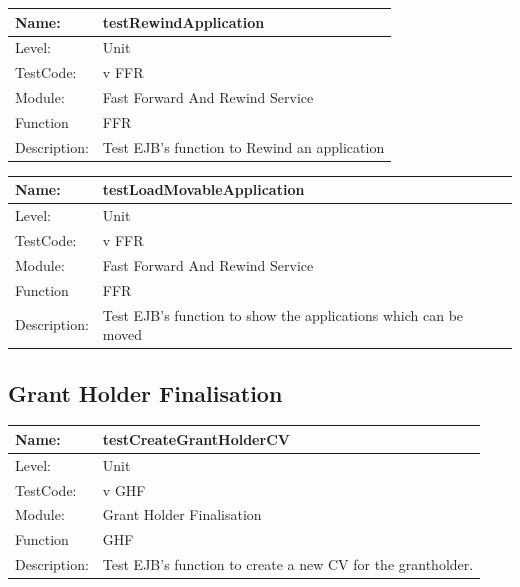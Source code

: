 \documentclass[12pt]{article}
\begin{document}
\begin{center}
\begin{tabular}{|l|p{12cm}|}
\hline

 Name: & testRewindApplication  \\
\hline
Level: & Unit \\
\hline
TestCode: & v FFR \\
\hline
Module:& Fast Forward And Rewind Service \\
\hline
Function & FFR \\
\hline
Description: & Test EJB's function to Rewind an application\\
\hline
\end{tabular}
\end{center}

\begin{center}
\begin{tabular}{|l|p{12cm}|}
\hline

 Name: & testLoadMovableApplication  \\
\hline
Level: & Unit \\
\hline
TestCode: & v FFR \\
\hline
Module:& Fast Forward And Rewind Service \\
\hline
Function & FFR \\
\hline
Description: & Test EJB's function to show the applications which can be moved\\
\hline
\end{tabular}
\end{center}

\subsection{Grant Holder Finalisation}

\begin{center}
\begin{tabular}{|l|p{12cm}|}
\hline

 Name: & testCreateGrantHolderCV  \\
\hline
Level: & Unit \\
\hline
TestCode: & v GHF \\
\hline
Module:& Grant Holder Finalisation \\
\hline
Function & GHF \\
\hline
Description: & Test EJB's function to create a new CV for the grantholder. \\
\hline
\end{tabular}
\end{center}
\end{document}
